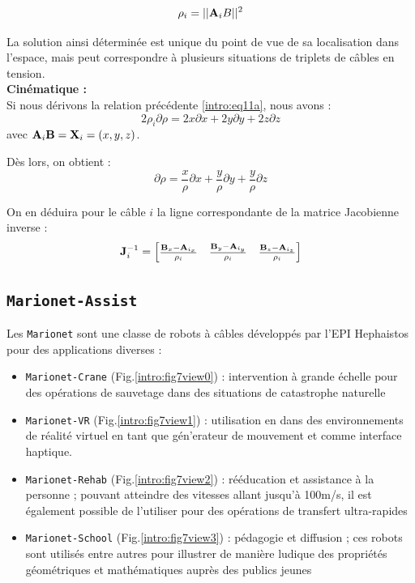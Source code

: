 \begin{equation}
\rho_i = ||{\bf A}_iB||^2
\label{intro:eq11a}
\end{equation}

La solution ainsi d\'etermin\'ee est unique du point de vue de sa localisation 
dans l'espace, mais peut correspondre \`a plusieurs situations de triplets de 
c\^ables en tension.\\

{\bf Cin\'ematique :}\\

Si nous d\'erivons la relation pr\'ec\'edente \ref{intro:eq11a}, nous avons :
\begin{equation}
2 \rho_i \partial \rho = 2 x \partial x + 2 y \partial y + 2 z \partial z
\label{intro:eq11a2}
\end{equation}
avec ${\bf A}_i{\bf B} = {\bf X}_i = (x, y, z)$.

D\`es lors, on obtient :
\begin{equation}
\partial \rho = \frac x \rho \partial x + \frac y \rho \partial y + \frac y 
\rho \partial z
\label{intro:eq11a3}
\end{equation}

On en d\'eduira pour le c\^able $i$ la ligne correspondante de la 
matrice Jaco\-bienne inverse :
\begin{equation}
{\bf J}^{-1}_i = 
\begin{bmatrix}
\frac {{\bf B}_x - {\bf A}_{i_x}} {\rho_i} & \frac {{\bf B}_y - {\bf A}_{i_y}} 
{\rho_i} & \frac {{\bf B}_z - {\bf A}_{i_z}} {\rho_i} 
\end{bmatrix}
\label{intro:eq11a4}
\end{equation}



\subsection{{\tt Marionet-Assist}} \label{chap0-2-2}

Les {\tt Marionet} sont une classe de robots à câbles développés par l'EPI 
Hephaistos pour des applications diverses \cite{merlet2010marionet} :
\begin{itemize}
 \item {\tt Marionet-Crane} (Fig.\ref{intro:fig7view0}) : intervention à grande 
échelle pour des opé\-rations de sauvetage dans des situations de catastrophe 
naturelle
 \item {\tt Marionet-VR} (Fig.\ref{intro:fig7view1}) : utilisation en dans des 
environnements de r\'ealit\'e virtuel en tant que g\'en'erateur de mouvement et 
comme interface haptique. 
 \item {\tt Marionet-Rehab} (Fig.\ref{intro:fig7view2}) : rééducation et 
assistance à la personne ; pouvant atteindre des vitesses allant jusqu'à 
100m/s, 
il est également possible de l'utiliser pour des opérations de transfert 
ultra-rapides
 \item {\tt Marionet-School} (Fig.\ref{intro:fig7view3}) : pédagogie et 
diffusion ; ces robots sont utilisés entre autres pour illustrer de manière 
ludique des propriétés géométriques et mathématiques auprès des publics jeunes
\end{itemize}

